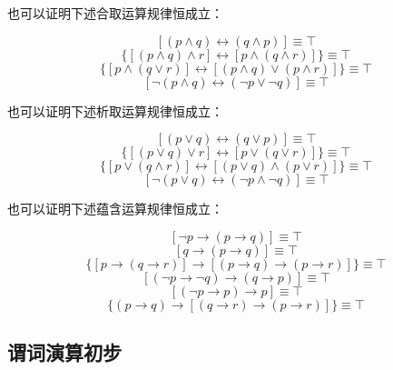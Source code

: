 也可以证明下述合取运算规律恒成立：

\[ [(p \land q) \leftrightarrow (q \land p)]                               \equiv \top \tag{合取交换律} \]
\[ \{[(p \land q) \land r] \leftrightarrow [p \land (q \land r)]\}         \equiv \top \tag{合取结合律} \]
\[ \{[p \land (q \lor r)] \leftrightarrow [(p \land q) \lor (p \land r)]\} \equiv \top \tag{合取分配律} \]
\[ [\lnot(p \land q) \leftrightarrow (\lnot{}p \lor \lnot{}q)]             \equiv \top \tag{合取德·摩根律} \]

也可以证明下述析取运算规律恒成立：

\[ [(p \lor q) \leftrightarrow (q \lor p)]                                 \equiv \top \tag{析取交换律} \]
\[ \{[(p \lor q) \lor r] \leftrightarrow [p \lor (q \lor r)]\}             \equiv \top \tag{析取结合律} \]
\[ \{[p \lor (q \land r)] \leftrightarrow [(p \lor q) \land (p \lor r)]\}  \equiv \top \tag{析取分配律} \]
\[ [\lnot(p \lor q) \leftrightarrow (\lnot{}p \land \lnot{}q)]             \equiv \top \tag{析取德·摩根律} \]

也可以证明下述蕴含运算规律恒成立：

\[ [\lnot{}p \to (p \to q)]                                                \equiv \top \tag{否定前件律} \]
\[ [q \to (p \to q)]                                                       \equiv \top \tag{肯定后件律} \]
\[ \{[p \to (q \to r)] \to [(p \to q) \to (p \to r)]\}                     \equiv \top \tag{蕴含分配律} \]
\[ [(\lnot{}p \to \lnot{}q) \to (q \to p)]                                 \equiv \top \tag{蕴含换位律} \]
\[ [(\lnot{}p \to p) \to p]                                                \equiv \top \tag{否定肯定律} \]
\[ \{(p \to q) \to [(q \to r) \to (p \to r)]\}                             \equiv \top \tag{假设三段论} \]

\subsection{谓词演算初步}

